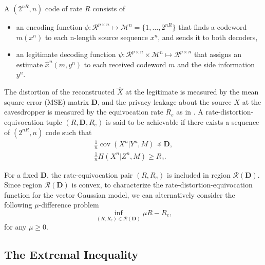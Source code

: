 \documentclass[journal,final, onecolumn]{IEEEtran}
\DeclareMathOperator{\cov}{cov}
\begin{document}
A $(2^{nR},n)$ code of rate $R$ consists of
\begin{itemize}
 \item an encoding function $\phi: \mathcal{R}^{p \times n} \mapsto \mathcal{M}^{n} = \{ 1, \ldots, 2^{nR}\}$ that finds a codeword $m(x^{n})$ to each n-length source sequence $x^{n}$, and sends it to both decoders,
  \item an legitimate decoding function $\psi: \mathcal{R}^{p \times n} \times  \mathcal{M}^{n} \mapsto \mathcal{R}^{p \times n}$ that assigns an estimate $\hat{x}^{n} (m, y^{n})$ to each received codeword $m$ and the side information $y^{n}$.
\end{itemize}
The distortion of the reconstructed $\hat{X}$ at the legitimate is measured by the mean square error (MSE) matrix $\boldsymbol{D}$,
and the privacy leakage about the source ${{X}}$ at the eavesdropper is measured by the equivocation rate $R_{e}$ as in \cite{Wyner75}.
A rate-distortion-equivocation tuple $(R, \boldsymbol{D}, R_{e})$ is said to be achievable if there exists a sequence of $(2^{nR},n)$ code such that
\begin{align}
\frac{1}{n} \cov \left( {X}^n | {Y}^{n}, M  \right) \preceq \boldsymbol{D}, \\
\frac{1}{n} H({X}^{n} | {Z}^{n}, M) \geq R_{e}.
\end{align}

For a fixed ${\boldsymbol{D}}$, the rate-equivocation pair $(R, R_{e})$ is included in region $\mathcal{R}({\boldsymbol{D}})$. Since region $\mathcal{R}({\boldsymbol{D}})$ is convex, to characterize the rate-distortion-equivocation function for the vector Gaussian model, we can alternatively consider the following $\mu$-difference problem
\begin{equation}
\inf_{(R, R_{e} )\in \mathcal{R}({\boldsymbol{D}})} \mu R-R_{e},
\end{equation}
for any $\mu \geq 0$.

\subsection{The Extremal Inequality}
\end{document}
